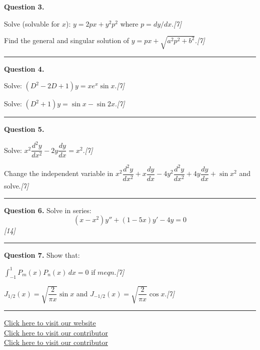 \documentclass[11pt,a4paper]{article}
\newcommand{\pts}[1]{\hfill   \textit{[#1]}}
\begin{document}
\medskip


\noindent   \textbf{Question 3.}

\begin{parts}
  \item Solve (solvable for $x$): $y=2px+y^2p^2$ where $p=dy/dx$.\pts{7}
  \item Find the general and singular solution of $y=px+\sqrt{a^2p^2+b^2}$.\pts{7}
\end{parts}
\medskip\rule{\linewidth}{0.2pt}

\medskip


\noindent   \textbf{Question 4.}

\begin{parts}
  \item Solve: $(D^2-2D+1)y=xe^x\sin x$.\pts{7}
  \item Solve: $(D^2+1)y=\sin x - \sin 2x$.\pts{7}
\end{parts}
\medskip\rule{\linewidth}{0.2pt}

\medskip


\noindent   \textbf{Question 5.}

\begin{parts}
  \item Solve: $x^2\dfrac{d^2y}{dx^2}-2y\dfrac{dy}{dx}=x^2$.\pts{7}
  \item Change the independent variable in $x^2\dfrac{d^2y}{dx^2}+x\dfrac{dy}{dx}-4y^2\dfrac{d^2y}{dx^2}+4y\dfrac{dy}{dx}+\sin x^2$ and solve.\pts{7}
\end{parts}
\medskip\rule{\linewidth}{0.2pt}

\medskip


\noindent   \textbf{Question 6.} Solve in series:
\[
  (x-x^2)y''+(1-5x)y'-4y=0
\]
\pts{14}
\medskip\rule{\linewidth}{0.2pt}

\medskip


\noindent   \textbf{Question 7.} Show that:

\begin{parts}
  \item $\displaystyle\int_{-1}^{1}P_m(x)P_n(x)\,dx=0$ if $m
eq n$.\pts{7}
  \item $J_{1/2}(x)=\sqrt{\dfrac{2}{\pi x}}\sin x$ and $J_{-1/2}(x)=\sqrt{\dfrac{2}{\pi x}}\cos x$.\pts{7}
\end{parts}

\vfill\rule{\linewidth}{0.4pt}

\begin{center}\small
\href{https://bhu-exam.vercel.app/}{Click here to visit our website}\\[4pt]
\href{https://me-aryan.vercel.app/}{Click here to visit our contributor}\\[4pt]
\href{https://quashan-me.vercel.app/}{Click here to visit our contributor}
\end{center}
\end{document}
